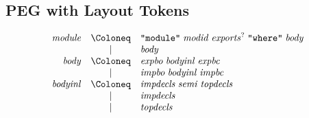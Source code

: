 \subsection{PEG with Layout Tokens}

\begin{align*}
  \begin{array}{rcl}
    \mathit{module}
    & \Coloneq & \text{\texttt{\textquotedbl module\textquotedbl}}\; \mathit{modid}\; \mathit{exports}^?\; \text{\texttt{\textquotedbl where\textquotedbl}}\; \mathit{body} \\
    & \mid & \mathit{body} \\
    \mathit{body}
    & \Coloneq & \mathit{expbo}\; \mathit{bodyinl}\; \mathit{expbc} \\
    & \mid & \mathit{impbo}\; \mathit{bodyinl}\; \mathit{impbc} \\
    \mathit{bodyinl}
    & \Coloneq & \mathit{impdecls}\; \mathit{semi}\; \mathit{topdecls} \\
    & \mid & \mathit{impdecls} \\
    & \mid & \mathit{topdecls} \\
  \end{array}
\end{align*}

